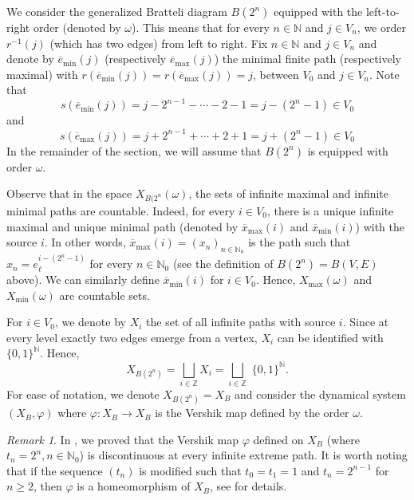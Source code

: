 \documentclass[11pt,reqno]{amsart}
\theoremstyle{definition}
\theoremstyle{remark}
\newtheorem{remark}[definition]{Remark}
\theoremstyle{plain}
\def\ol{\overline}
\newcommand{\N}{\mathbb N}
\newcommand{\Z}{\mathbb Z}
\numberwithin{equation}{section}
\begin{document}
We consider the generalized Bratteli diagram $B(2^n)$ equipped with the left-to-right order (denoted by $\omega$). This means that for every $n \in \N$ and $j \in V_{n}$, 
we order $r^{-1} (j)$ (which has two edges) from left to right. Fix $n \in \N$ and $j \in V_{n}$ and denote by $\ol{e}_{\mathrm{min}} (j)$ (respectively $\ol{e}_{\mathrm{max}} (j)$) the minimal finite path (respectively maximal) with $r(\ol{e}_{\mathrm{min}} (j)) = r(\ol{e}_{\mathrm{max}} (j)) = j$, between $V_0$ and $j\in V_n$. Note that
\[
s(\ol{e}_{\mathrm{min}} (j)) = j-  2^{n-1} - \cdots - 2 - 1 = j - (2^n-1) \in V_0
\] and 
\[
s(\ol{e}_{\mathrm{max}} (j)) = j+  2^{n-1} + \cdots + 2 + 1 = j + (2^n-1) \in V_0
\] 
In the remainder of the section, we will assume that $B(2^n)$ is equipped with order $\omega$.



Observe that in the space $X_{B(2^n}(\omega)$, the sets of infinite maximal and infinite minimal paths are countable. Indeed, for every $i \in V_0$, there is a unique infinite maximal and unique minimal path (denoted by
$\ol{x}_{\mathrm{max}} (i)$ and $\ol{x}_{\mathrm{min}} (i) $) with the source $i$. In other words, $\ol{x}_{\mathrm{max}} (i) = (x_n)_{n\in \N_0}$ is the path such that $x_n = e_\ell^{i - (2^n-1)}$ for every $n \in \N_0$ (see the definition of $B(2^n) = B(V,E)$ above). We can similarly define $\ol{x}_{\mathrm{min}} (i) $ for $i\in V_0$. Hence, $X_{\mathrm{max}} (\omega)$ and $X_{\mathrm{min}} (\omega)$ are countable sets. 

For $i \in V_0$, we denote by $X_i$ the set of all infinite paths with source $i$. Since at every level exactly two edges emerge from a vertex, $X_i$ can be identified with $\{0,1\}^\N$. Hence,
\[
X_{B(2^n)} = \bigsqcup_{i \in \Z} X_i =\bigsqcup_{i \in \Z} \,\, \{0,1\}^\N. 
\]
For ease of notation, we denote $X_{B(2^n)} = X_B$ and consider the dynamical system $(X_B,\varphi)$ where $\varphi: X_B \rightarrow X_B$ is the Vershik map defined by the order $\omega$. 

\begin{remark}
In \cite[Theorem 3.10]{BezuglyiJorgensenKarpelSanadhya2025}, 
we proved that the Vershik map $\varphi$ defined on $X_B$ (where $t_n = 2^n, n \in \N_0$) is discontinuous at every infinite extreme path.
It is worth noting that if the sequence $(t_n)$ is modified such that $t_0 = t_1 =1$ and $t_n = 2^{n-1}$ for $n \geq 2$, then $\varphi $ is a homeomorphism of $X_B$, see \cite[Theorem 3.12]{BezuglyiJorgensenKarpelSanadhya2025} for details.
\end{remark}
\end{document}
